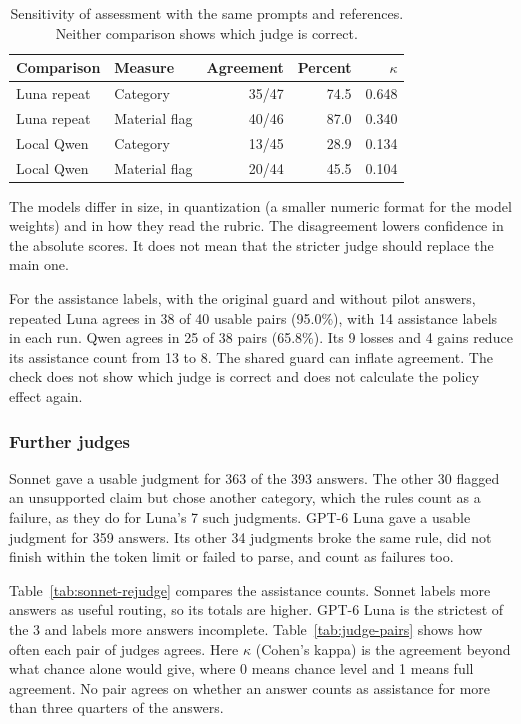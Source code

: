 \begin{table}[htbp]
\centering
\caption[Sensitivity of assessment under matched prompts and references]{Sensitivity of assessment with the same prompts and references. Neither comparison shows which judge is correct.}
\label{tab:judge-agreement}
\begin{tabular}{llrrr}
\toprule
Comparison & Measure & Agreement & Percent & $\kappa$ \\
\midrule
Luna repeat & Category & 35/47 & 74.5 & 0.648 \\
Luna repeat & Material flag & 40/46 & 87.0 & 0.340 \\
Local Qwen & Category & 13/45 & 28.9 & 0.134 \\
Local Qwen & Material flag & 20/44 & 45.5 & 0.104 \\
\bottomrule
\end{tabular}
\end{table}

The models differ in size, in quantization (a smaller numeric format for the model weights) and in how they read the rubric. The disagreement lowers confidence in the absolute scores. It does not mean that the stricter judge should replace the main one.

For the assistance labels, with the original guard and without pilot answers, repeated Luna agrees in 38 of 40 usable pairs (95.0\%), with 14 assistance labels in each run. Qwen agrees in 25 of 38 pairs (65.8\%). Its 9 losses and 4 gains reduce its assistance count from 13 to 8. The shared guard can inflate agreement. The check does not show which judge is correct and does not calculate the policy effect again.

\subsubsection{Further judges}
\label{sec:sonnet-rejudge}

Sonnet gave a usable judgment for 363 of the 393 answers. The other 30 flagged an unsupported claim but chose another category, which the rules count as a failure, as they do for Luna's 7 such judgments. GPT-6 Luna gave a usable judgment for 359 answers. Its other 34 judgments broke the same rule, did not finish within the token limit or failed to parse, and count as failures too.

Table~\ref{tab:sonnet-rejudge} compares the assistance counts. Sonnet labels more answers as useful routing, so its totals are higher. GPT-6 Luna is the strictest of the 3 and labels more answers incomplete. Table~\ref{tab:judge-pairs} shows how often each pair of judges agrees. Here $\kappa$ (Cohen's kappa) is the agreement beyond what chance alone would give, where 0 means chance level and 1 means full agreement. No pair agrees on whether an answer counts as assistance for more than three quarters of the answers.


